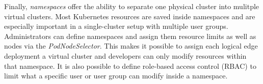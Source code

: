 Finally, \textit{namespaces} offer the ability to separate one physical cluster into mulitple virtual clusters. Most Kubernetes resources are saved inside namespaces and are especially important in a single-cluster setup with multiple user groups. Administrators can define namespaces and assign them resource limits as well as nodes via the \textit{PodNodeSelector}. This makes it possible to assign each logical edge deployment a virtual cluster and developers can only modify resources within that namespace. It is also possible to define role-based access control (RBAC) to limit what a specific user or user group can modify inside a namespace. 
